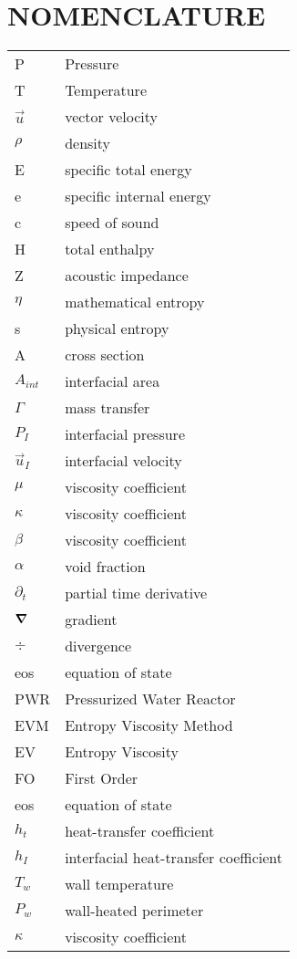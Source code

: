 %
%
%


\chapter*{NOMENCLATURE}

\begin{longtable}[l]{l l}
P & Pressure\tabularnewline
T & Temperature\tabularnewline
$\vec{u}$ & vector velocity \tabularnewline
$\rho$ & density \tabularnewline
E & specific total energy \tabularnewline
e & specific internal energy \tabularnewline
c & speed of sound \tabularnewline
H & total enthalpy \tabularnewline
Z & acoustic impedance \tabularnewline
$\eta$ & mathematical entropy \tabularnewline
s & physical entropy \tabularnewline
A & cross section \tabularnewline
$A_{int}$ & interfacial area \tabularnewline
$\Gamma$ & mass transfer \tabularnewline
$P_I$ & interfacial pressure \tabularnewline
$\vec{u}_I$ & interfacial velocity \tabularnewline
$\mu$ & viscosity coefficient \tabularnewline
$\kappa$ & viscosity coefficient \tabularnewline
$\beta$ & viscosity coefficient \tabularnewline
$\alpha$ & void fraction \tabularnewline
$\partial_t$ & partial time derivative \tabularnewline
$\boldsymbol{\nabla}$ & gradient \tabularnewline
$\div$ & divergence \tabularnewline
eos & equation of state \tabularnewline
PWR & Pressurized Water Reactor \tabularnewline
EVM & Entropy Viscosity Method \tabularnewline
EV & Entropy Viscosity\tabularnewline
FO & First Order \tabularnewline
eos & equation of state \tabularnewline
$h_t$ &  heat-transfer coefficient\tabularnewline
$h_I$ & interfacial heat-transfer coefficient \tabularnewline
$T_w$ & wall temperature \tabularnewline
$P_w$ & wall-heated perimeter \tabularnewline
$\kappa$ & viscosity coefficient \tabularnewline
\end{longtable}

\vspace{2em}
\pagebreak{}